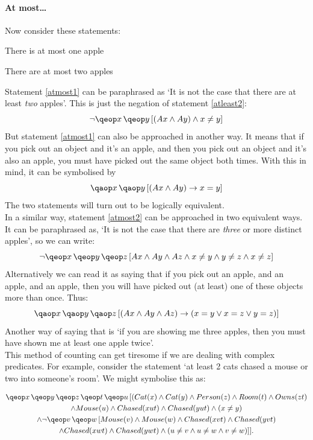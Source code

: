 \documentclass[PHIL101-Textbook.tex]{subfiles}
\begin{document}
\pagebreak


\paragraph{At most\ldots}
Now consider these statements:
\begin{earg}
	\item[\ex{atmost1}] There is at most one apple
	\item[\ex{atmost2}] There are at most two apples
\end{earg}
Statement \ref{atmost1} can be paraphrased as `It is not the case that there are at least \emph{two} apples'. This is just the negation of statement \ref{atleast2}: 
$$\enot \qe{x}{\qeb{y}{(\atom A x  \eand \atom A y ) \eand x\neq y}}$$
But statement \ref{atmost1} can also be approached in another way. It means that if you pick out an object and it's an apple, and then you pick out an object and it's also an apple, you must have picked out the same object both times. With this in mind, it can be symbolised by
$$\qa{x}{\qab{y}{(\atom A x  \eand \atom A y ) \eif x=y}}$$
The two statements will turn out to be logically equivalent.\\

In a similar way, statement \ref{atmost2} can be approached in two equivalent ways. It can be paraphrased as, `It is not the case that there are \emph{three} or more distinct apples', so we can write:
$$\enot \qe{x}{\qe{y}{\qeb{z}{\atom A x  \eand \atom A y  \eand \atom A z  \eand x\neq y \eand y \neq z \eand x\neq z}}}$$
Alternatively we can read it as saying that if you pick out an apple, and an apple, and an apple, then you will have picked out (at least) one of these objects more than once. Thus:
$$\qa{x}{\qa{y}{\qab{z}{(\atom A x  \eand \atom A y  \eand \atom A z ) \eif (x=y \eor x=z \eor y=z)}}}$$
Another way of saying that is `if you are showing me three apples, then you must have shown me at least one apple twice'.\\

This method of counting can get tiresome if we are dealing with complex predicates. For example, consider the statement `at least 2 cats chased a mouse or two into someone's room'. We might symbolise this as:

\begin{multline*}
	\qe{x}{}\qe{y}{}\qe{z}{}\qe{t}{}\qeb{u}{
	  (Cat(x) \eand Cat(y)   \eand Person(z) \eand Room (t) \eand Owns(zt) \\
  \eand Mouse(u) \eand Chased(xut) \eand Chased(yut) 
	  \eand (x\neq y ) \\
	  \eand \enot \qe{v}{}\qeb{w}{Mouse(v) \eand Mouse(w) \eand Chased(xvt) \eand Chased(yvt) \\
	  \eand Chased(xwt) \eand Chased(ywt) \eand (u\neq v \eand u\neq w \eand v \neq w)}
	}.
\end{multline*}
\end{document}
